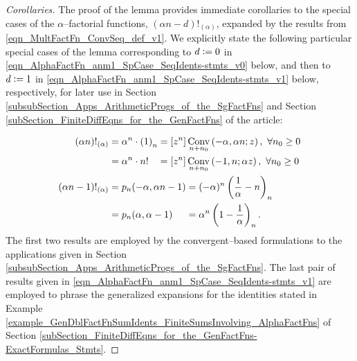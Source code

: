 \documentclass[12pt,reqno]{article}
\renewenvironment{subequations}{%
  \refstepcounter{equation}%
  \edef\theparentequation{\theequation}%
  \setcounter{parentequation}{\value{equation}}%
  \setcounter{equation}{0}%
  \def\theequation{\theparentequation.\alph{equation}}%
  \ignorespaces
}{%
  \setcounter{equation}{\value{parentequation}}%
  \ignorespacesafterend
}
\numberwithin{sfootnote}{section}
\numberwithin{equation}{section}
\theoremstyle{plain}
\theoremstyle{definition}
\theoremstyle{remark}
\newcommand{\defequals}{\ensuremath{\vcentcolon=}}
\newcommand{\StartGroupingSubEquations}{\begin{subequations}}
\newcommand{\EndGroupingSubEquations}{\end{subequations}}
\newcommand{\Pochhammer}[2]{\ensuremath{\left(#1\right)_{#2}}}
\newcommand{\ConvGF}[4]{\ensuremath{\Conv_{#1}\left(#2, #3; #4\right)}}
\DeclareMathOperator{\Conv}{Conv}
\begin{document}
\begin{proof}[Corollaries] 
The proof of the lemma provides immediate corollaries 
to the special cases of the $\alpha$--factorial functions, 
$(\alpha n-d)!_{(\alpha)}$, expanded by the results from 
\eqref{eqn_MultFactFn_ConvSeq_def_v1}. 
We explicitly state the 
following particular special cases of the lemma corresponding to 
$d \defequals 0$ in \eqref{eqn_AlphaFactFn_anm1_SpCase_SeqIdents-stmts_v0} 
below, and then to $d \defequals 1$ in 
\eqref{eqn_AlphaFactFn_anm1_SpCase_SeqIdents-stmts_v1} below, respectively, 
for later use in 
Section \ref{subsubSection_Apps_ArithmeticProgs_of_the_SgFactFns} and 
Section \ref{subSection_FiniteDiffEqns_for_the_GenFactFns} 
of the article: 
\StartGroupingSubEquations 
\begin{align} 
\label{eqn_AlphaFactFn_anm1_SpCase_SeqIdents-stmts_v0} 
(\alpha n)!_{(\alpha)} 
     & = \alpha^{n} \cdot \Pochhammer{1}{n} 
       = [z^n] \ConvGF{n+n_0}{-\alpha}{\alpha n}{z},\ 
       \forall n_0 \geq 0 \\ 
\notag 
    & = \alpha^{n} \cdot n! 
       \phantom{(_{n}} = 
       [z^n] \ConvGF{n+n_0}{-1}{n}{\alpha z},\ 
       \forall n_0 \geq 0 \\ 
\label{eqn_AlphaFactFn_anm1_SpCase_SeqIdents-stmts_v1} 
(\alpha n-1)!_{(\alpha)} & = 
     p_n(-\alpha, \alpha n-1) = 
     (-\alpha)^{n} \Pochhammer{\frac{1}{\alpha}-n}{n} \\ 
\notag 
     & = 
     p_n(\alpha, \alpha - 1) 
     \phantom{-n} = 
     \alpha^{n} \Pochhammer{1-\frac{1}{\alpha}}{n}. 
\end{align} 
\EndGroupingSubEquations 
The first two results are employed by the convergent--based formulations to the 
applications given in 
Section \ref{subsubSection_Apps_ArithmeticProgs_of_the_SgFactFns}. 
The last pair of results given in 
\eqref{eqn_AlphaFactFn_anm1_SpCase_SeqIdents-stmts_v1} 
are employed to phrase the generalized expansions for the identities stated in 
Example \ref{example_GenDblFactFnSumIdents_FiniteSumsInvolving_AlphaFactFns} 
of 
Section \ref{subSection_FiniteDiffEqns_for_the_GenFactFns-ExactFormulas_Stmts}. 
\end{proof} 
\end{document}
